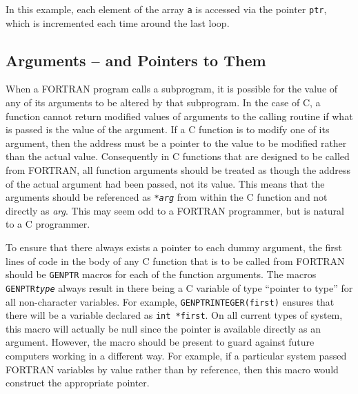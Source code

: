 \documentclass[twoside,11pt]{article}
\newcommand{\htmlref}[2]{#1}
\newcommand{\xlabel}[1]{}
\renewcommand{\_}{\texttt{\symbol{95}}}
\begin{document}
In this example, each element of the array \texttt{a} is accessed via the 
pointer \texttt{ptr}, which is incremented each time around the last loop.

\subsection{\xlabel{arguments_dash_and_pointers_to_them}Arguments -- and Pointers to Them}

When a FORTRAN program calls a subprogram, it is possible for the value of any
of its arguments to be altered by that subprogram. In the case of C, a function
cannot return modified values of arguments to the calling routine if what is
passed is the value of the argument. If a C function is to modify one of its
argument, then the address must be a pointer to the value to be modified rather
than the actual value. Consequently in C functions that are designed to be
called from FORTRAN, all function arguments should be treated as though the
address of the actual argument had been passed, not its value. This means that
the arguments should be referenced as \texttt{*\textit{arg}}\/ from within the C
function and not directly as \textit{arg}. This may seem odd to a FORTRAN
programmer, but is natural to a C programmer. 

To ensure that there always exists a pointer to each dummy argument,
the first lines of code in the body of any C function that is to be called from
FORTRAN should be \texttt{GENPTR} macros for each of the function arguments. 
The macros 
\htmlref{\texttt{GENPTR\_\textit{type}}}{GENPTR_type}
always result in there being a C variable of type ``pointer to type'' for 
all non-character variables. 
For example, \texttt{GENPTR\_\-INTEGER(first)} ensures that there will be
a variable declared as \texttt{int *first}. On all current types of system,
this macro will actually be null since the pointer is available directly as an
argument. However, the macro should be present to guard against future
computers working in a different way. For example, if a particular system
passed FORTRAN variables by value rather than by reference, then this macro
would construct the appropriate pointer.
\end{document}
